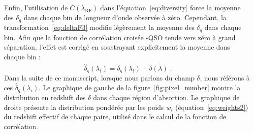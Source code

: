 \documentclass[11pt, twoside, a4paper, openright]{report}
\begin{document}
Enfin, l'utilisation de $\overline C(\lambda_{\mathrm{RF}})$ dans l'équation~\ref{eq:diversity} force la moyenne des $\delta_q$ dans chaque bin de longueur d'onde observée à zéro. Cependant, la transformation~\ref{eq:deltaF3} modifie légèrement la moyenne des $\delta_q$  dans chaque bin. Afin que la fonction de corrélation croisée \lya{}-QSO tende vers zéro à grand séparation, l'effet est corrigé en soustrayant explicitement la moyenne dans chaque bin :
\begin{equation}
  \hat \delta_q(\lambda_i) = \tilde \delta_q(\lambda_i) - \overline{\tilde \delta(\lambda)} \; .
\end{equation}
Dans la suite de ce manuscript, lorsque nous parlons du champ $\delta$, nous référons à ces $\hat \delta_q(\lambda_i)$. Le graphique de gauche de la figure~\ref{fig:pixel_number} montre la distribution en redshift des $\delta$ dans chaque région d'absortion. Le graphique de droite présente la distribution pondérée par les poids $w_i$ (équation~\ref{eq:weights2}) du redshift effectif de chaque paire, utilisé dans le calcul de la fonction de corrélation.



  

\end{document}
